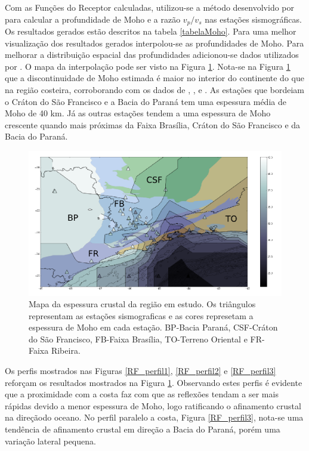 Com as Funções do Receptor calculadas, utilizou-se a método desenvolvido por \cite{Zhu_Kanamori_2000} para calcular a profundidade de Moho e a razão $v_{p}/v_{s}$ nas estações sismográficas. Os resultados gerados estão descritos na tabela \ref{tabelaMoho}. Para uma melhor visualização dos resultados gerados interpolou-se as profundidades de Moho. Para melhorar a distribuição espacial das profundidades adicionou-se dados utilizados por \cite{Assumpcao_Brazil_2013}. O mapa da interpolação pode ser visto na Figura \ref{Interpolacao}. Nota-se na Figura \ref{Interpolacao} que a discontinuidade de Moho estimada é maior no interior do continente do que na região costeira, corroborando com os dados de \cite{sand_franca_crustal_2004}, \cite{Assumpcao_America_2013}, \cite{Assumpcao_Brazil_2013} e \cite{van_der_meijde_gravity_2013}. As estações que bordeiam o Cráton do São Francisco e a Bacia do Paraná tem uma espessura média de Moho de 40 km. Já as outras estações tendem a uma espessura de Moho crescente quando mais próximas da Faixa Brasília, Cráton do São Francisco e da Bacia do Paraná.

\begin{figure}[!ht]
\centering
\includegraphics[scale=0.5]{Figs/Interpolacao_Linear.png}
\caption[Mapa da espessura crustal da região em estudo.]{Mapa da espessura crustal da região em estudo. Os triângulos representam as estações sismograficas e as cores represetam a espessura de Moho em cada estação. BP-Bacia Paraná, CSF-Cráton do São Francisco, FB-Faixa Brasília, TO-Terreno Oriental  e FR-Faixa Ribeira.}
\label{Interpolacao}
\end{figure}

Os perfis mostrados nas Figuras \ref{RF_perfil1}, \ref{RF_perfil2} e \ref{RF_perfil3} reforçam  os resultados mostrados na Figura \ref{Interpolacao}. Observando estes perfis é evidente que a proximidade com a costa  faz com que as reflexões tendam a ser mais rápidas devido a menor espessura de Moho, logo ratificando o afinamento crustal na direçãodo oceano. No perfil paralelo a costa, Figura \ref{RF_perfil3}, nota-se uma tendência de afinamento crustal em direção a Bacia do Paraná, porém uma variação lateral pequena. 

